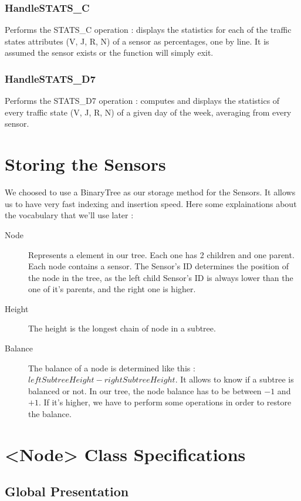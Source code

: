 \documentclass[10pt]{article}
\begin{document}
\subsubsection*{HandleSTATS\_C}
Performs the STATS\_C operation : displays the statistics for each of the traffic states attributes (V, J, R, N) of a sensor as percentages, one by line. It is assumed the sensor exists or the function will simply exit.

\subsubsection*{HandleSTATS\_D7}
Performs the STATS\_D7 operation : computes and displays the statistics of every traffic state (V, J, R, N) of a given day of the week, averaging from every sensor.

\section{Storing the Sensors}
We choosed to use a BinaryTree as our storage method for the Sensors. It allows us to have very fast indexing and insertion speed.
Here some explainations about the vocabulary that we'll use later :
\begin{description}
	\item[Node] Represents a element in our tree. Each one has 2 children and one parent. Each node contains a sensor. The Sensor's ID determines the position of the node in the tree, as the left child Sensor's ID is always lower than the one of it's parents, and the right one is higher.
	\item[Height] The height is the longest chain of node in a subtree.
	\item[Balance] The balance of a node is determined like this : $ leftSubtreeHeight - rightSubtreeHeight$. It allows to know if a subtree is balanced or not. In our tree, the node balance has to be between $-1$ and $+1$. If it's higher, we have to perform some operations in order to restore the balance.
\end{description}

\section{<Node> Class Specifications}
\subsection{Global Presentation}
\end{document}

